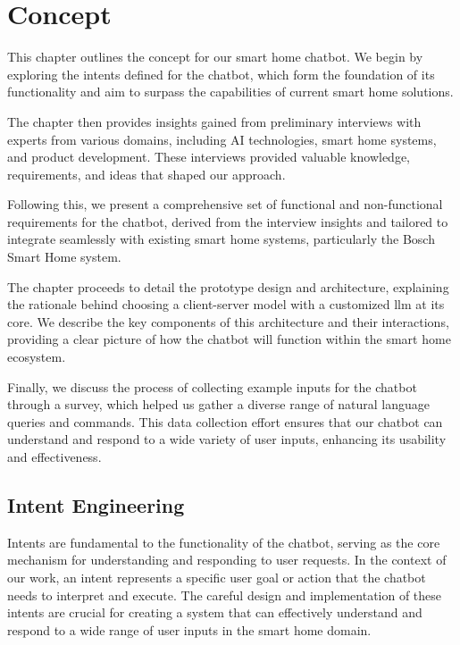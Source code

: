 
\chapter{Concept}
\label{chap:concept}

This chapter outlines the concept for our smart home chatbot. We begin by exploring the intents defined for the chatbot, which form the foundation of its functionality and aim to surpass the capabilities of current smart home solutions.

The chapter then provides insights gained from preliminary interviews with experts from various domains, including AI technologies, smart home systems, and product development. These interviews provided valuable knowledge, requirements, and ideas that shaped our approach.

Following this, we present a comprehensive set of functional and non-functional requirements for the chatbot, derived from the interview insights and tailored to integrate seamlessly with existing smart home systems, particularly the Bosch Smart Home system.

The chapter proceeds to detail the prototype design and architecture, explaining the rationale behind choosing a client-server model with a customized \gls{llm} at its core. We describe the key components of this architecture and their interactions, providing a clear picture of how the chatbot will function within the smart home ecosystem.

Finally, we discuss the process of collecting example inputs for the chatbot through a survey, which helped us gather a diverse range of natural language queries and commands. This data collection effort ensures that our chatbot can understand and respond to a wide variety of user inputs, enhancing its usability and effectiveness.

\section{Intent Engineering}
\label{sec:intent-eng}
Intents are fundamental to the functionality of the chatbot, serving as the core mechanism for understanding and responding to user requests. In the context of our work, an intent represents a specific user goal or action that the chatbot needs to interpret and execute. The careful design and implementation of these intents are crucial for creating a system that can effectively understand and respond to a wide range of user inputs in the smart home domain.

